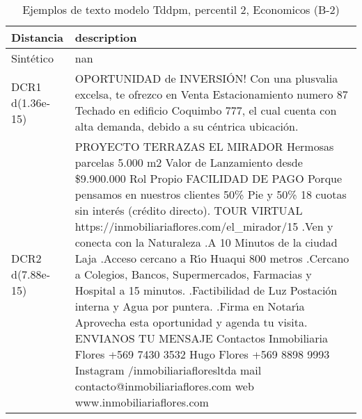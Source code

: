 \begin{table}[H]
\centering
\fontsize{10}{14}\selectfont
\caption{Ejemplos de texto modelo Tddpm, percentil 2, Economicos (B-2)}
\label{table-example-economicos-b-2-tddpm_mlp-2p-text}
\begin{tabular}{|l|m{35em}|}
\hline
\rowcolor[gray]{0.8}
Distancia & description \\
\hline Sintético & nan \\
\hline DCR1 d(1.36e-15) & OPORTUNIDAD de INVERSI\'ON!  Con una plusvalia excelsa, te ofrezco en Venta Estacionamiento numero 87 Techado en edificio Coquimbo 777, el cual cuenta con alta demanda, debido a su c\'entrica ubicaci\'on. \\
\hline DCR2 d(7.88e-15) & PROYECTO TERRAZAS EL MIRADOR Hermosas parcelas 5.000 m2 Valor de Lanzamiento desde \$9.900.000 Rol Propio  FACILIDAD DE PAGO Porque pensamos en nuestros clientes  50\% Pie y 50\% 18 cuotas sin inter\'es (cr\'edito directo).  TOUR VIRTUAL https://inmobiliariaflores.com/el\_mirador/15  .Ven y conecta con la Naturaleza .A 10 Minutos de la ciudad Laja .Acceso cercano a R{\'\i}o Huaqui 800 metros .Cercano a Colegios, Bancos, Supermercados, Farmacias y Hospital a 15 minutos. .Factibilidad de Luz Postaci\'on interna y Agua por puntera. .Firma en Notar{\'\i}a  Aprovecha esta oportunidad y agenda tu visita.  ENVIANOS TU MENSAJE Contactos  Inmobiliaria Flores +569 7430 3532 Hugo Flores +569 8898 9993  Instagram /inmobiliariafloresltda mail contacto@inmobiliariaflores.com web www.inmobiliariaflores.com \\
\hline
\end{tabular}
\end{table}

